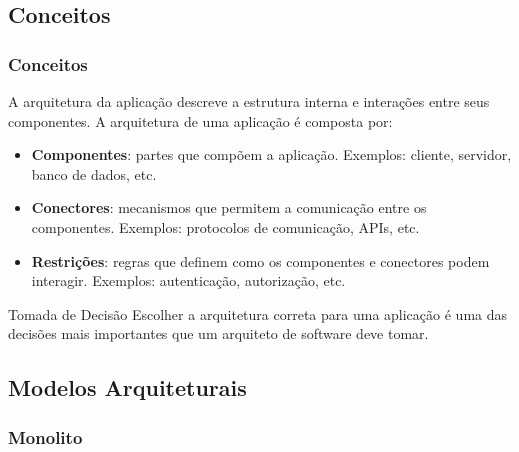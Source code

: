 \documentclass[
	10pt, %
	t, %
]{beamer}
\begin{document}

\subsection{Conceitos}

\begin{frame}
	\frametitle{Conceitos}
	
	A \alert{arquitetura da aplicação} descreve a estrutura interna e interações entre seus componentes. A arquitetura de uma aplicação é composta por:

	\begin{itemize}
		\item \textbf{Componentes}: partes que compõem a aplicação. Exemplos: cliente, servidor, banco de dados, etc.
		\item \textbf{Conectores}: mecanismos que permitem a comunicação entre os componentes. Exemplos: protocolos de comunicação, APIs, etc.
		\item \textbf{Restrições}: regras que definem como os componentes e conectores podem interagir. Exemplos: autenticação, autorização, etc.
	\end{itemize}
	\bigskip %

	\begin{alertblock}{Tomada de Decisão}
		Escolher a arquitetura correta para uma aplicação é uma das decisões mais importantes que um arquiteto de software deve tomar.
	\end{alertblock}
\end{frame}


\subsection{Modelos Arquiteturais}
\subsubsection{Monolito}
\end{document}
